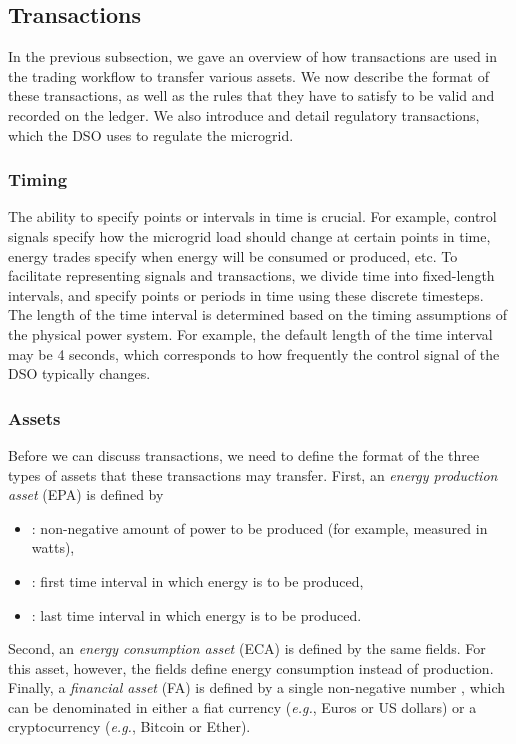 \subsection{Transactions}

In the previous subsection, we gave an overview of how transactions
are used in the trading workflow to transfer various assets.  We now
describe the format of these transactions, as well as the rules that
they have to satisfy to be valid and recorded on the ledger.  We also
introduce and detail regulatory transactions, which the
DSO uses to regulate the microgrid.

\subsubsection{Timing}
The ability to specify points or intervals in time is crucial.  For
example, control signals specify how the microgrid load should change
at certain points in time, energy trades specify when energy will be
consumed or produced, etc.  To facilitate representing signals and
transactions, we divide time into fixed-length intervals, and specify
points or periods in time using these discrete timesteps.  The length
of the time interval is determined based on the timing assumptions of
the physical power system.  For example, the default length of the
time interval may be 4 seconds, which corresponds to how frequently
the control signal of the DSO typically changes.      

\subsubsection{Assets}
Before we can discuss transactions, we need to define the format of the three
types of assets that these transactions may transfer.  First, an
\emph{energy production asset} (EPA) is defined by
\begin{itemize}[noitemsep,topsep=-\parskip]
\item {}: non-negative amount of power to be produced (for example, measured in watts),
\item {}: first time interval in which energy is to be produced,
\item {}: last time interval in which energy is to be produced.
\end{itemize}
\vspace{\parskip} Second, an \emph{energy consumption asset} (ECA) is
defined by the same fields.  For this asset, however, the fields
define energy consumption instead of production.  Finally, a
\emph{financial asset} (FA) is defined by a single non-negative number
, which can be denominated in either a fiat currency
(\emph{e.g.}, Euros or US dollars) or a cryptocurrency (\emph{e.g.},
Bitcoin or Ether).

